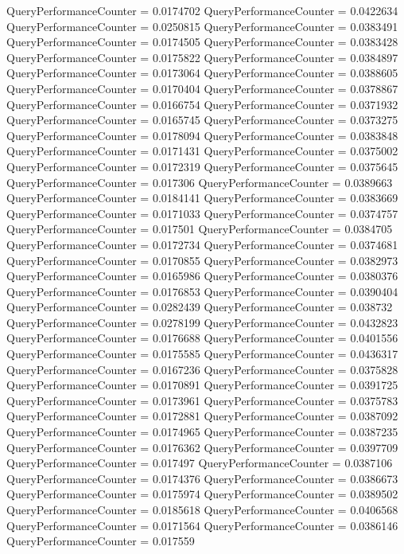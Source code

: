 \documentclass[9pt]{article}
\theoremstyle{plain}
\theoremstyle{definition}
\theoremstyle{remark}
\numberwithin{equation}{section}
\begin{document}
QueryPerformanceCounter  =  0.0174702
QueryPerformanceCounter  =  0.0422634
QueryPerformanceCounter  =  0.0250815
QueryPerformanceCounter  =  0.0383491
QueryPerformanceCounter  =  0.0174505
QueryPerformanceCounter  =  0.0383428
QueryPerformanceCounter  =  0.0175822
QueryPerformanceCounter  =  0.0384897
QueryPerformanceCounter  =  0.0173064
QueryPerformanceCounter  =  0.0388605
QueryPerformanceCounter  =  0.0170404
QueryPerformanceCounter  =  0.0378867
QueryPerformanceCounter  =  0.0166754
QueryPerformanceCounter  =  0.0371932
QueryPerformanceCounter  =  0.0165745
QueryPerformanceCounter  =  0.0373275
QueryPerformanceCounter  =  0.0178094
QueryPerformanceCounter  =  0.0383848
QueryPerformanceCounter  =  0.0171431
QueryPerformanceCounter  =  0.0375002
QueryPerformanceCounter  =  0.0172319
QueryPerformanceCounter  =  0.0375645
QueryPerformanceCounter  =  0.017306
QueryPerformanceCounter  =  0.0389663
QueryPerformanceCounter  =  0.0184141
QueryPerformanceCounter  =  0.0383669
QueryPerformanceCounter  =  0.0171033
QueryPerformanceCounter  =  0.0374757
QueryPerformanceCounter  =  0.017501
QueryPerformanceCounter  =  0.0384705
QueryPerformanceCounter  =  0.0172734
QueryPerformanceCounter  =  0.0374681
QueryPerformanceCounter  =  0.0170855
QueryPerformanceCounter  =  0.0382973
QueryPerformanceCounter  =  0.0165986
QueryPerformanceCounter  =  0.0380376
QueryPerformanceCounter  =  0.0176853
QueryPerformanceCounter  =  0.0390404
QueryPerformanceCounter  =  0.0282439
QueryPerformanceCounter  =  0.038732
QueryPerformanceCounter  =  0.0278199
QueryPerformanceCounter  =  0.0432823
QueryPerformanceCounter  =  0.0176688
QueryPerformanceCounter  =  0.0401556
QueryPerformanceCounter  =  0.0175585
QueryPerformanceCounter  =  0.0436317
QueryPerformanceCounter  =  0.0167236
QueryPerformanceCounter  =  0.0375828
QueryPerformanceCounter  =  0.0170891
QueryPerformanceCounter  =  0.0391725
QueryPerformanceCounter  =  0.0173961
QueryPerformanceCounter  =  0.0375783
QueryPerformanceCounter  =  0.0172881
QueryPerformanceCounter  =  0.0387092
QueryPerformanceCounter  =  0.0174965
QueryPerformanceCounter  =  0.0387235
QueryPerformanceCounter  =  0.0176362
QueryPerformanceCounter  =  0.0397709
QueryPerformanceCounter  =  0.017497
QueryPerformanceCounter  =  0.0387106
QueryPerformanceCounter  =  0.0174376
QueryPerformanceCounter  =  0.0386673
QueryPerformanceCounter  =  0.0175974
QueryPerformanceCounter  =  0.0389502
QueryPerformanceCounter  =  0.0185618
QueryPerformanceCounter  =  0.0406568
QueryPerformanceCounter  =  0.0171564
QueryPerformanceCounter  =  0.0386146
QueryPerformanceCounter  =  0.017559
\end{document}
